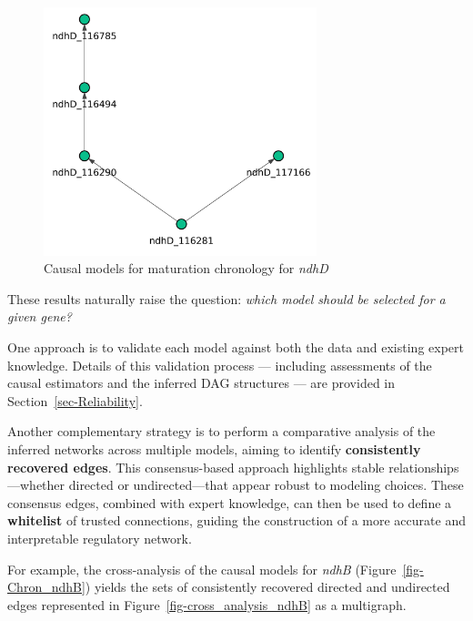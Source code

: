 \documentclass[
]{article}
\theoremstyle{definition}
\theoremstyle{remark}
\begin{document}
\begin{figure}[H]
\begin{minipage}{0.43\linewidth}
\end{minipage}%
%
\begin{minipage}{0.13\linewidth}
~\end{minipage}%
%
\begin{minipage}{0.43\linewidth}

\includegraphics[width=3.125in,height=\textheight,keepaspectratio]{Figures Causal Chronology/chron_DAG_NOTEARS_ndhD.png}

\end{minipage}%

\caption{\label{fig-Chron_ndhD}Causal models for maturation chronology
for \emph{ndhD}}

\end{figure}%

These results naturally raise the question: \emph{which model should be
selected for a given gene?}

One approach is to validate each model against both the data and
existing expert knowledge. Details of this validation process ---
including assessments of the causal estimators and the inferred DAG
structures --- are provided in Section~\ref{sec-Reliability}.

Another complementary strategy is to perform a comparative analysis of
the inferred networks across multiple models, aiming to identify
\textbf{consistently recovered edges}. This consensus-based approach
highlights stable relationships---whether directed or undirected---that
appear robust to modeling choices. These consensus edges, combined with
expert knowledge, can then be used to define a \textbf{whitelist} of
trusted connections, guiding the construction of a more accurate and
interpretable regulatory network.

For example, the cross-analysis of the causal models for \emph{ndhB}
(Figure~\ref{fig-Chron_ndhB}) yields the sets of consistently recovered
directed and undirected edges represented in
Figure~\ref{fig-cross_analysis_ndhB} as a multigraph.
\end{document}
